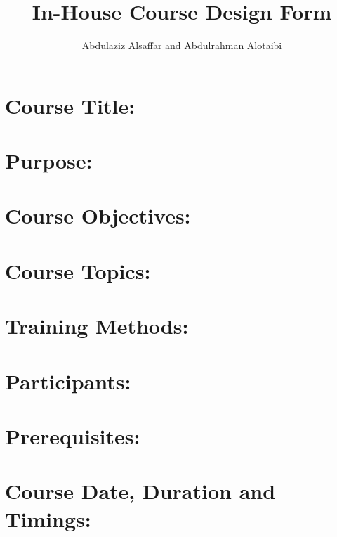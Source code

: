 \documentclass[a4paper,11pt]{article}
\author{Abdulaziz Alsa{f}far and Abdulrahman Alotaibi}
\title{In-House Course Design Form}
\begin{document}
\maketitle
\pagestyle{plain}
\setcounter{page}{1}

\section{Course Title:}
\section{Purpose:}
\section{Course Objectives:}
\section{Course Topics:}
\section{Training Methods:}
\section{Participants:}
\section{Prerequisites:}
\section{Course Date, Duration and Timings:}
\end{document}
